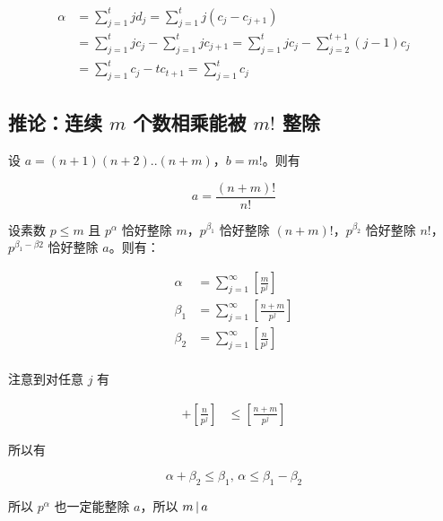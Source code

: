 \begin{align*}
\alpha & = \sum_{j=1}^{t} j d_j = \sum_{j=1}^{t}j(c_j - c_{j+1}) \\
    & = \sum_{j=1}^{t}jc_j - \sum_{j=1}^{t}jc_{j+1} = \sum_{j=1}^{t}jc_j - \sum_{j=2}^{t+1}(j-1)c_{j} \\
    & = \sum_{j=1}^{t}c_j - tc_{t+1} = \sum_{j=1}^{t} c_j
\end{align*}

\subsection{推论：连续 $m$ 个数相乘能被 $m!$ 整除}

设 $a = (n+1)(n+2)..(n+m)$，$b = m!$。则有

\[
a = \frac{(n+m)!}{n!}
\]

设素数 $p \le m$  且 $p^\alpha$ 恰好整除 $m$，$p^{\beta_1}$ 恰好整除 $(n+m)!$，$p^{\beta_2}$ 恰好整除 $n!$，$p^{\beta_1 - \beta2}$ 恰好整除 $a$。则有：

\begin{align*}
    \alpha &= \sum_{j=1}^{\infty}[\frac{m}{p^j}] \\
    \beta_1 &= \sum_{j=1}^{\infty}[\frac{n+m}{p^j}] \\
    \beta_2 &= \sum_{j=1}^{\infty}[\frac{n}{p^j}] \\
\end{align*}

注意到对任意 $j$ 有 

\begin{align*}
    [\frac{m}{p^j}] + [\frac{n}{p^j}] & \le [\frac{n+m}{p^j}]
\end{align*}

所以有

\[
\alpha + \beta_2 \le \beta_1, \, \alpha \le \beta_1 - \beta_2
\]

所以 $p^\alpha$ 也一定能整除 $a$，所以 $m \,\vert\, a$